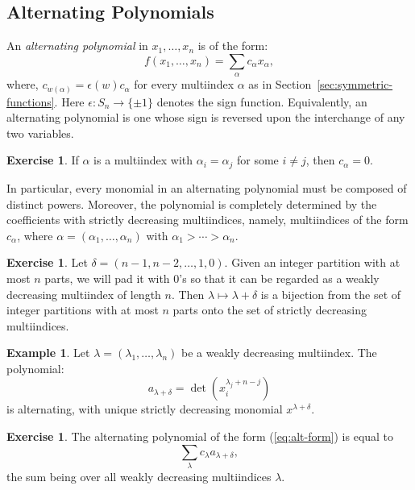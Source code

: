 \documentclass[11pt]{amsproc}
\theoremstyle{definition}
\theoremstyle{example}
\newtheorem{example}[theorem]{Example}
\newtheorem{exercise}[theorem]{Exercise}
\begin{document}
\subsection{Alternating Polynomials}
\label{sec:alt-poly}
An \emph{alternating polynomial} in $x_1,\dotsc, x_n$ is of the form:
\begin{equation}
  \label{eq:alt-form}
  f(x_1,\dotsc,x_n) = \sum_{\alpha} c_\alpha x_\alpha,
\end{equation}
where, $c_{w(\alpha)} = \epsilon(w)c_\alpha$ for every multiindex $\alpha$ as in Section~\ref{sec:symmetric-functions}.
Here $\epsilon:S_n\to \{\pm 1\}$ denotes the sign function.
Equivalently, an alternating polynomial is one whose sign is reversed upon the interchange of any two variables.
\begin{exercise}
  If $\alpha$ is a multiindex with $\alpha_i=\alpha_j$ for some $i\neq j$, then $c_\alpha = 0$.
\end{exercise}
In particular, every monomial in an alternating polynomial must be composed of distinct powers.
Moreover, the polynomial is completely determined by the coefficients with strictly decreasing multiindices, namely, multiindices of the form $c_\alpha$, where $\alpha=(\alpha_1,\dotsc,\alpha_n)$ with $\alpha_1>\dotsb>\alpha_n$.
\begin{exercise}
  Let $\delta=(n-1,n-2,\dotsc,1, 0)$.
  Given an integer partition with at most $n$ parts, we will pad it with $0$'s so that it can be regarded as a weakly decreasing multiindex of length $n$.
  Then $\lambda\mapsto \lambda+\delta$ is a bijection from the set of integer partitions with at most $n$ parts onto the set of strictly decreasing multiindices.
\end{exercise}
\begin{example}
  Let $\lambda = (\lambda_1,\dotsc, \lambda_n)$ be a weakly decreasing multiindex.
  The polynomial:
  \begin{displaymath}
    a_{\lambda+\delta} = \det(x_i^{\lambda_j + n - j})
  \end{displaymath}
  is alternating, with unique strictly decreasing monomial $x^{\lambda+\delta}$.
\end{example}
\begin{exercise}
  \label{exercise:alt-basis}
  The alternating polynomial of the form \textup{(\ref{eq:alt-form})} is equal to  \begin{displaymath}
    \sum_{\lambda} c_\lambda a_{\lambda+\delta},
  \end{displaymath}
  the sum being over all weakly decreasing multiindices $\lambda$.
\end{exercise}
\end{document}
